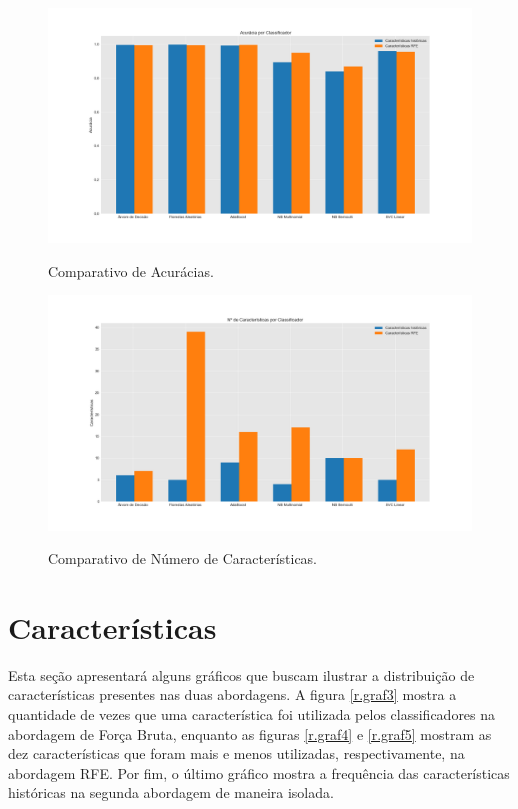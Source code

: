 \begin{figure}[h]
\caption{Comparativo de Acurácias.}
\centering
\includegraphics[scale=0.30]{figs/ComparativoAcuracias.png}
\label{r.graf1}
\end{figure}

\begin{figure}[h]
\caption{Comparativo de Número de Características.}
\centering
\includegraphics[scale=0.30]{figs/ComparativoCaracs.png}
\label{r.graf2}
\end{figure}

\section{Características}

Esta seção apresentará alguns gráficos que buscam ilustrar a distribuição de características presentes nas duas abordagens. A figura \ref{r.graf3} mostra a quantidade de vezes que uma característica foi utilizada pelos classificadores na abordagem de Força Bruta, enquanto as figuras \ref{r.graf4} e \ref{r.graf5} mostram as dez características que foram mais e menos utilizadas, respectivamente, na abordagem RFE. Por fim, o último gráfico mostra a frequência das características históricas na segunda abordagem de maneira isolada. 

